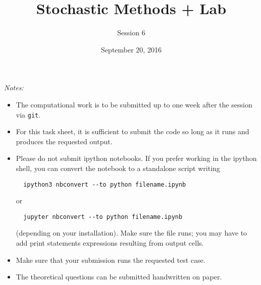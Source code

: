 \documentclass[12pt]{article}
\begin{document}
\title{Stochastic Methods + Lab}
\author{Session 6}
\date{September 20, 2016}
\maketitle

\noindent\emph{Notes:} 
\begin{itemize}
\item The computational work is to be submitted up to
one week after the session via \texttt{git}.  
\item For this task sheet, it
is sufficient to submit the code so long as it runs and produces the
requested output. 

\item Please do not submit \textsf{ipython} notebooks.  If you prefer
working in the ipython shell, you can convert the notebook to a
standalone script writing
\begin{verbatim}
  ipython3 nbconvert --to python filename.ipynb
\end{verbatim}
or 
\begin{verbatim}
  jupyter nbconvert --to python filename.ipynb
\end{verbatim}
(depending on your installation).  Make sure the file runs; you may
have to add print statements expressions resulting from output cells.

\item Make sure that your submission runs the requested test case.  

\item The theoretical questions can be submitted handwritten on paper.
\end{itemize}
\end{document}
